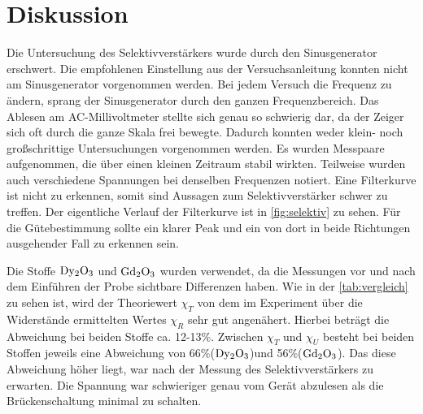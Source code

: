 \section{Diskussion}
\label{sec:Diskussion}

Die Untersuchung des Selektivverstärkers wurde durch den Sinusgenerator erschwert.
Die empfohlenen Einstellung aus der Versuchsanleitung konnten nicht am Sinusgenerator vorgenommen werden.
Bei jedem Versuch die Frequenz zu ändern, sprang der Sinusgenerator durch den ganzen Frequenzbereich.
Das Ablesen am AC-Millivoltmeter stellte sich genau so schwierig dar, da der Zeiger sich oft durch die ganze Skala frei bewegte.
Dadurch konnten weder klein- noch großschrittige Untersuchungen vorgenommen werden.
Es wurden Messpaare aufgenommen, die über einen kleinen Zeitraum stabil wirkten.
Teilweise wurden auch verschiedene Spannungen bei denselben Frequenzen notiert.
Eine Filterkurve ist nicht zu erkennen, somit sind Aussagen zum Selektivverstärker schwer zu treffen.
Der eigentliche Verlauf der Filterkurve ist in \autoref{fig:selektiv} zu sehen. 
Für die Gütebestimmung sollte ein klarer Peak und ein von dort in beide Richtungen ausgehender Fall zu erkennen sein.

\noindent
Die Stoffe $\ce{Dy2O3}$ und $\ce{Gd2O3}$ wurden verwendet, da die Messungen vor und nach dem Einführen der Probe sichtbare Differenzen haben.
Wie in der \autoref{tab:vergleich} zu sehen ist, wird der Theoriewert $\chi_T$ von dem im Experiment über die Widerstände ermittelten Wertes $\chi_R$ sehr gut angenähert.
Hierbei beträgt die Abweichung bei beiden Stoffe ca. 12-13\%.
Zwischen $\chi_T$ und $\chi_U$ besteht bei beiden Stoffen jeweils eine Abweichung von 66\%($\ce{Dy2O3}$)und 56\%($\ce{Gd2O3}$).
Das diese Abweichung höher liegt, war nach der Ḿessung des Selektivverstärkers zu erwarten.
Die Spannung war schwieriger genau vom Gerät abzulesen als die Brückenschaltung minimal zu schalten.

